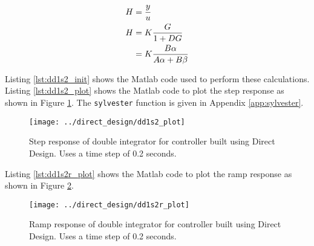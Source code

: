 \documentclass{article}
\newcommand{\sincludepdf}[2][]{
	
}
\begin{document}
\begin{align}
	H &= \frac{y}{u} \notag \\
	H &= K \frac{G}{1 + D G} \\
	  &= K \frac{B \alpha}{A \alpha + B \beta}
\end{align}

\sincludepdf[pages=1,
			pagecommand=\subsection*{Example 1}
	]{scan/11211302.pdf}
\sincludepdf[pages=2-5]{scan/11211302.pdf}

Listing \ref{lst:dd1s2_init} shows the Matlab code used to perform
these calculations.
Listing \ref{lst:dd1s2_plot} shows the Matlab code to plot the step response
as shown in Figure \ref{fig:dd1s2_plot}.
The \verb+sylvester+ function is given in Appendix \ref{app:sylvester}.



\clearpage


\begin{figure}
\begin{center}
\texttt{[image: ../direct\_design/dd1s2\_plot]}
\end{center}
\caption{Step response of double integrator for controller built
using Direct Design. Uses a time step of 0.2 seconds.}
\label{fig:dd1s2_plot}
\end{figure}

\clearpage
Listing \ref{lst:dd1s2r_plot} shows the Matlab code to plot the ramp response
as shown in Figure \ref{fig:dd1s2r_plot}.



\begin{figure}
\begin{center}
\texttt{[image: ../direct\_design/dd1s2r\_plot]}
\end{center}
\caption{Ramp response of double integrator for controller built
using Direct Design. Uses a time step of 0.2 seconds.}
\label{fig:dd1s2r_plot}
\end{figure}
\end{document}
